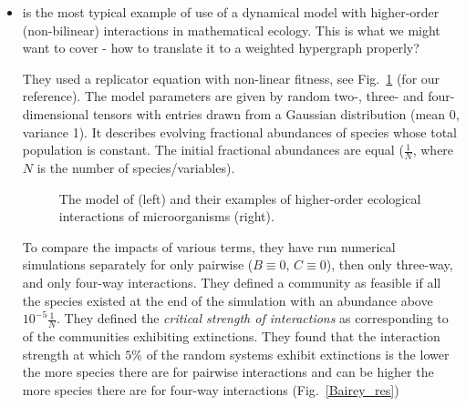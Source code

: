 \documentclass[a4paper,12pt]{article}
\theoremstyle{definition}
\theoremstyle{remark}
\begin{document}
\begin{itemize}


    \item \cite{Bairey2016} is the most typical example of use of a dynamical model with higher-order (non-bilinear) interactions in mathematical ecology. This is what we might want to cover - how to translate it to a weighted hypergraph properly?
    
    They used a replicator equation with non-linear fitness, see Fig.~\ref{Bairey_eq_ex} (for our reference). The model parameters are given by random two-, three- and four-dimensional tensors with entries drawn from a Gaussian distribution (mean 0, variance 1). It describes evolving fractional abundances of species whose total population is constant. The initial fractional abundances are equal ($\tfrac{1}{N}$, where $N$ is the number of species/variables).
    \begin{figure}[h!]
	\begin{center}
        \caption{The model of \cite{Bairey2016} (left) and their examples of higher-order ecological interactions of microorganisms (right).} 
    	\label{Bairey_eq_ex}
    \end{center}
    \end{figure}
    To compare the impacts of various terms, they have run numerical simulations separately for only pairwise ($B\equiv 0$, $C\equiv 0$), then only three-way, and only four-way interactions.
    They defined a community as feasible if all the species existed at the end of the simulation with an abundance above $10^{-5}\tfrac{1}{N}$. They defined the \emph{critical strength of interactions} as corresponding to  of the communities exhibiting extinctions. 
    They found that the interaction strength at which $5\%$ of the random systems exhibit extinctions is the lower the more species there are for pairwise interactions and can be higher the more species there are for four-way interactions (Fig.~\ref{Bairey_res})


\end{itemize}
\end{document}
